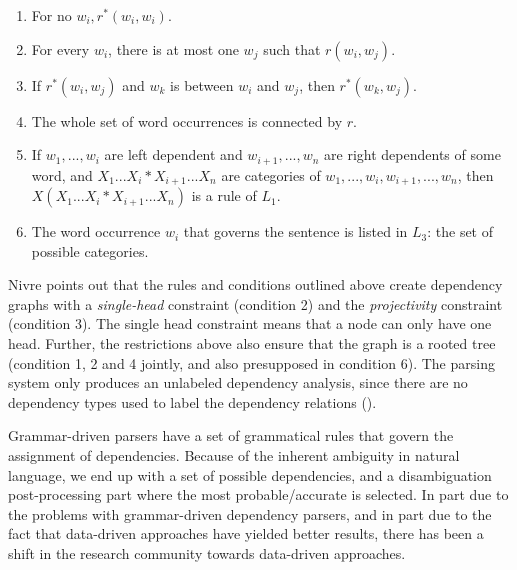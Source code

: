 \documentclass[10pt]{article}
\begin{document}
\begin{enumerate}
\item For no $w_i , r{^*} (w_i,w_i)$.
\item For every $w_i$, there is at most one $w_j$ such that $r(w_i,w_j)$.
\item If $r{^*} (w_i,w_j)$ and $w_k$ is between $w_i$ and $w_j$, then $r{^*}(w_k,w_j)$.
\item The whole set of word occurrences is connected by $r$.
\item If $w_1, . . ., w_i$ are left dependent and $w_{i + 1}, . . ., w_n$ are right dependents of some word, and $X_1 ... X_i * X_{i + 1} ... X_n$ are categories of $w_1, . . ., w_i, w_{i + 1}, . . ., w_n$, then $X(X_1 ... X_i * X_{i + 1} ... X_n)$ is a rule of \textit{$L_1$}.
\item The word occurrence $w_i$ that governs the sentence is listed in \textit{$L_3$}: the set of possible categories.
\end{enumerate}

Nivre points out that the rules and conditions outlined above create dependency graphs with a \textit{single-head} constraint (condition 2) and the \textit{projectivity} constraint (condition 3). The single head constraint means that a node can only have one head. Further, the restrictions above also ensure that the graph is a rooted tree (condition 1, 2 and 4 jointly, and also presupposed in condition 6). The parsing system only produces an unlabeled dependency analysis, since there are no dependency types used to label the dependency relations (\cite{Nivre05dependencygrammar}).

Grammar-driven parsers have a set of grammatical rules that govern the assignment of dependencies. Because of the inherent ambiguity in natural language, we end up with a set of possible dependencies, and a disambiguation post-processing part where the most probable/accurate is selected. In part due to the problems with grammar-driven dependency parsers, and in part due to the fact that data-driven approaches have yielded better results, there has been a shift in the research community towards data-driven approaches.

\end{document}
